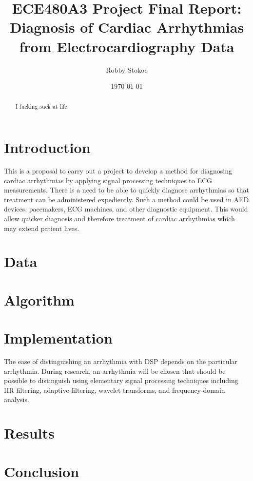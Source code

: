 \documentclass[12pt,letter]{article}
\title{ECE480A3 Project Final Report: Diagnosis of Cardiac Arrhythmias from
Electrocardiography Data}
\author{Robby Stokoe}
\date{\today}
\begin{document}
\maketitle

\begin{abstract}
    I fucking suck at life
\end{abstract}

\section{Introduction} 
This is a proposal to carry out a project to develop a method for diagnosing
cardiac arrhythmias by applying signal processing techniques to ECG
measurements.  There is a need to be able to quickly diagnose arrhythmias so
that treatment can be administered expediently.  Such a method could be used in
AED devices, pacemakers, ECG machines, and other diagnostic equipment.  This
would allow quicker diagnosis and therefore treatment of cardiac arrhythmias
which may extend patient lives.  

\section{Data}

\section{Algorithm}

\section{Implementation}
The ease of distinguishing an arrhythmia with DSP depends on the particular
arrhythmia.  During research, an arrhythmia will be chosen that should be
possible to distinguish using elementary signal processing techniques including
IIR filtering, adaptive filtering, wavelet transforms, and frequency-domain
analysis.  

\section{Results}

\section{Conclusion}

\begin{thebibliography}{99}

\end{thebibliography}
\end{document}
